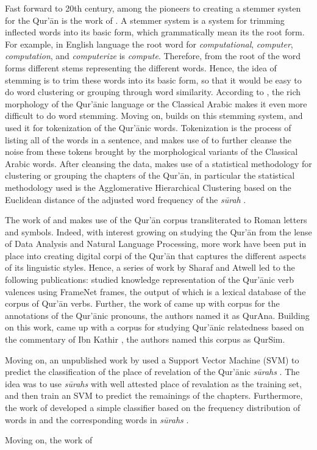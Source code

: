 Fast forward to 20th century, among the pioneers to creating a stemmer systen for the Qur'\=an is the work of . A stemmer system is a system for trimming inflected words into its basic form, which grammatically mean its the root form. For example, in English language the root word for \textit{computational}, \textit{computer}, \textit{computation}, and \textit{computerize} is \textit{compute}. Therefore, from the root of the word forms different stems representing the different words. Hence, the idea of stemming is to trim these words into its basic form, so that it would be easy to do word clustering or grouping through word similarity. According to , the rich morphology of the Qur'\=anic language or the Classical Arabic makes it even more difficult to do word stemming. Moving on,  builds on this stemming system, and used it for tokenization of the Qur'\=anic words. Tokenization is the process of listing all of the words in a sentence, and  makes use of  to further cleanse the noise from these tokens brought by the morphological variants of the Classical Arabic words. After cleansing the data,  makes use of a statistical methodology for clustering or grouping the chapters of the Qur'\=an, in particular the statistical methodology used is the Agglomerative Hierarchical Clustering based on the Euclidean distance of the adjusted word frequency of the \textit{s\=urah} .

The work of  and  makes use of the Qur'\=an corpus transliterated to Roman letters and symbols. Indeed, with interest growing on studying the Qur'\=an from the lense of Data Analysis and Natural Language Processing, more work have been put in place into creating digital corpi of the Qur'\=an that captures the different aspects of its linguistic styles. Hence, a series of work by Sharaf and Atwell led to the following publications:  studied knowledge representation of the Qur'\=anic verb valences using FrameNet frames, the output of which is a lexical database of the corpus of Qur'\=an verbs. Further, the work of  came up with corpus for the annotations of the Qur'\=anic pronouns, the authors named it as QurAna. Building on this work,  came up with a corpus for studying Qur'\=anic relatedness based on the commentary of Ibn Kathir , the authors named this corpus as QurSim.

Moving on, an unpublished work by  used a Support Vector Machine (SVM) to predict the classification of the place of revelation of the Qur'\=anic \textit{s\=urahs} . The idea was to use \textit{s\=urahs}  with well attested place of revalation as the training set, and then train an SVM to predict the remainings of the chapters. Furthermore, the work of  developed a simple classifier based on the frequency distribution of words in   and the corresponding words in \textit{s\=urahs} .

Moving on, the work of 